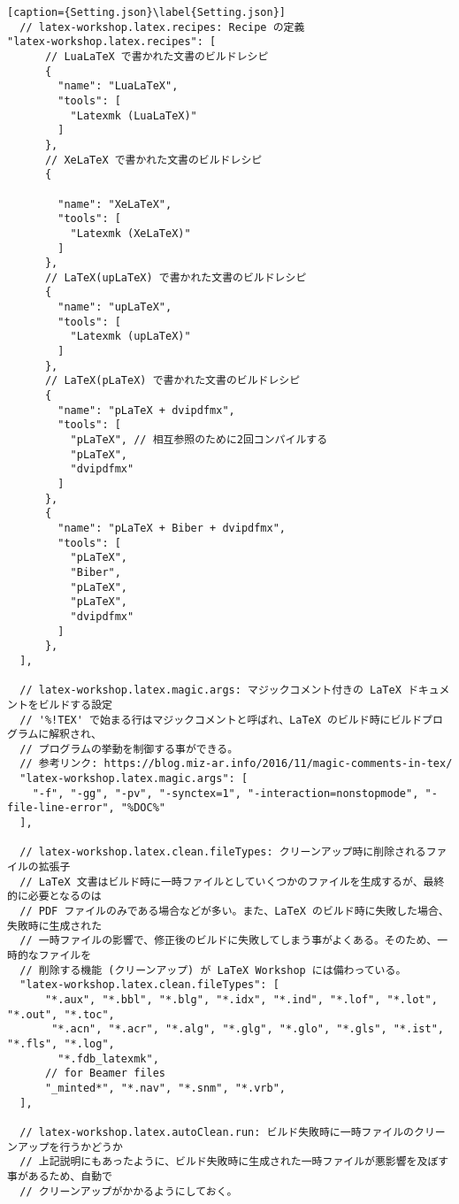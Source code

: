 \documentclass{ltjsarticle}
\begin{document}
\begin{lstlisting}[caption={Setting.json}\label{Setting.json}]
  // latex-workshop.latex.recipes: Recipe の定義
"latex-workshop.latex.recipes": [
      // LuaLaTeX で書かれた文書のビルドレシピ
      {
        "name": "LuaLaTeX",
        "tools": [
          "Latexmk (LuaLaTeX)"
        ]
      },
      // XeLaTeX で書かれた文書のビルドレシピ
      {
        
        "name": "XeLaTeX",
        "tools": [
          "Latexmk (XeLaTeX)"
        ]
      },
      // LaTeX(upLaTeX) で書かれた文書のビルドレシピ
      {
        "name": "upLaTeX",
        "tools": [
          "Latexmk (upLaTeX)"
        ]
      },
      // LaTeX(pLaTeX) で書かれた文書のビルドレシピ
      {
        "name": "pLaTeX + dvipdfmx",
        "tools": [
          "pLaTeX", // 相互参照のために2回コンパイルする
          "pLaTeX",
          "dvipdfmx"
        ]
      },
      {
        "name": "pLaTeX + Biber + dvipdfmx",
        "tools": [
          "pLaTeX",
          "Biber",
          "pLaTeX",
          "pLaTeX",
          "dvipdfmx"
        ]
      },
  ],

  // latex-workshop.latex.magic.args: マジックコメント付きの LaTeX ドキュメントをビルドする設定
  // '%!TEX' で始まる行はマジックコメントと呼ばれ、LaTeX のビルド時にビルドプログラムに解釈され、
  // プログラムの挙動を制御する事ができる。
  // 参考リンク: https://blog.miz-ar.info/2016/11/magic-comments-in-tex/
  "latex-workshop.latex.magic.args": [
    "-f", "-gg", "-pv", "-synctex=1", "-interaction=nonstopmode", "-file-line-error", "%DOC%"
  ],

  // latex-workshop.latex.clean.fileTypes: クリーンアップ時に削除されるファイルの拡張子
  // LaTeX 文書はビルド時に一時ファイルとしていくつかのファイルを生成するが、最終的に必要となるのは
  // PDF ファイルのみである場合などが多い。また、LaTeX のビルド時に失敗した場合、失敗時に生成された
  // 一時ファイルの影響で、修正後のビルドに失敗してしまう事がよくある。そのため、一時的なファイルを
  // 削除する機能 (クリーンアップ) が LaTeX Workshop には備わっている。
  "latex-workshop.latex.clean.fileTypes": [
      "*.aux", "*.bbl", "*.blg", "*.idx", "*.ind", "*.lof", "*.lot", "*.out", "*.toc",
       "*.acn", "*.acr", "*.alg", "*.glg", "*.glo", "*.gls", "*.ist", "*.fls", "*.log",
        "*.fdb_latexmk", 
      // for Beamer files
      "_minted*", "*.nav", "*.snm", "*.vrb",
  ],

  // latex-workshop.latex.autoClean.run: ビルド失敗時に一時ファイルのクリーンアップを行うかどうか
  // 上記説明にもあったように、ビルド失敗時に生成された一時ファイルが悪影響を及ぼす事があるため、自動で
  // クリーンアップがかかるようにしておく。


\end{lstlisting}
\end{document}

